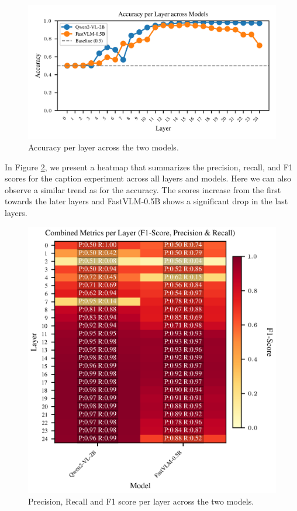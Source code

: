 \documentclass[11pt]{article}
\begin{document}
\begin{figure}[H]
    \centering
    \includegraphics[width=1\linewidth]{figures/global/_combined_exp1/accuracy_lines_per_layer.png}
    \caption{Accuracy per layer across the two models.}
    \label{fig:accuracy_per_layer}
\end{figure}
\noindent In Figure \ref{fig:combined_metrics_per_layer}, we present a heatmap that summarizes the precision, recall, and F1 scores for the caption experiment across all layers and models.
Here we can also observe a similar trend as for the accuracy. The scores increase from the first towards the later layers and FastVLM-0.5B shows a significant drop in the last layers.
\begin{figure}[H]
    \centering
    \includegraphics[width=1\linewidth]{figures/global/_combined_exp1/combined_metrics_heatmap.png}
    \caption{Precision, Recall and F1 score per layer across the two models.}
    \label{fig:combined_metrics_per_layer}
\end{figure}
\end{document}
